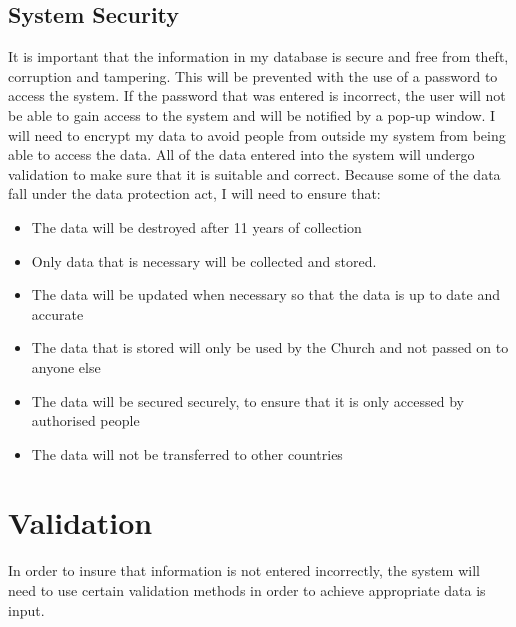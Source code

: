 \subsection{System Security}

It is important that the information in my database is secure and free from theft, corruption and tampering. This will be prevented with the use of a password to access the system. If the password that was entered is incorrect, the user will not be able to gain access to the system and will be notified by a pop-up window. I will need to encrypt my data to avoid people from outside my system from being able to access the data. All of the data entered into the system will undergo validation to make sure that it is suitable and correct.
Because some of the data fall under the data protection act, I will need to ensure that:
\begin{itemize}
    \item The data will be destroyed after 11 years of collection
    \item Only data that is necessary will be collected and stored.
    \item The data will be updated when necessary so that the data is up to date and accurate
    \item The data that is stored will only be used by the Church and not passed on to anyone else
    \item The data will be secured securely, to ensure that it is only accessed by authorised people
    \item The data will not be transferred to other countries
\end{itemize}


\section{Validation}

In order to insure that information is not entered incorrectly, the system will need to use certain validation methods in order to achieve appropriate data is input.

